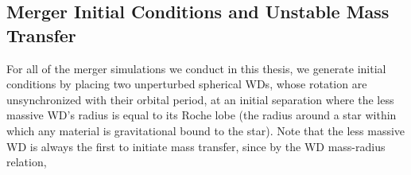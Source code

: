 
\subsection{Merger Initial Conditions and Unstable Mass Transfer}
\label{ssec:c1_stable_mass_transfer}

For all of the merger simulations we conduct in this thesis, we generate initial conditions by placing two unperturbed spherical WDs, whose rotation are unsynchronized with their orbital period, at an initial separation where the less massive WD's radius is equal to its Roche lobe (the radius around a star within which any material is gravitational bound to the star).  Note that the less massive WD is always the first to initiate mass transfer, since by the WD mass-radius relation,

